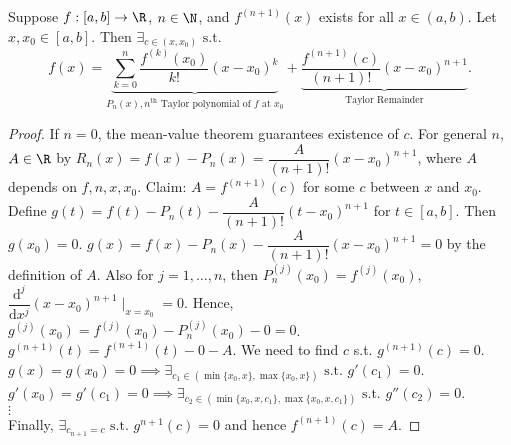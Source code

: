 \begin{thm}
	Suppose $f:[a,b]\to \R$, $n \in \N$, and $f^{(n+1)}(x)$ exists for all $x \in (a,b)$.
	Let $x, x_0 \in [a,b]$. Then $\exists_{c \in (x, x_0)} \text{ s.t. }$
	\[f(x)=\underbrace{\sum_{k=0}^{n}{\dfrac{f^{(k)}(x_0)}{k!}(x-x_0)^{k}}}_{P_n(x),\text{$n^{\text{th}}$ Taylor polynomial of $f$ at $x_0$}}+\underbrace{\dfrac{f^{(n+1)}(c)}{(n+1)!}(x-x_0)^{n+1}}_{\text{Taylor Remainder}}.\]
	\begin{proof}
		If $n=0$, the mean-value theorem guarantees existence of $c$.
		For general $n$, $A \in \R$ by $R_n(x)=f(x)-P_n(x)=\dfrac{A}{(n+1)!}(x-x_0)^{n+1}$, where $A$ depends on $f,n,x,x_0$.
		Claim: $A=f^{(n+1)}(c)$ for some $c$ between $x$ and $x_0$.\\
		Define $g(t)=f(t)-P_{n}(t)-\dfrac{A}{(n+1)!}(t-x_0)^{n+1}$ for $t \in [a,b]$. Then $g(x_0)=0$.
		$g(x)=f(x)-P_{n}(x)-\dfrac{A}{(n+1)!}(x-x_0)^{n+1}=0$ by the definition of $A$.
		Also for $j=1,\ldots ,n$, then $P_{n}^{(j)}(x_0)=f^{(j)}(x_0)$, $\dfrac{\mathrm{d}^{j}}{\mathrm{d}x^{j}}(x-x_0)^{n+1} \mid_{x=x_0}=0$.
		Hence, $g^{(j)}(x_0)=f^{(j)}(x_0)-P_{n}^{(j)}(x_0)-0=0$.
		$g^{(n+1)}(t)=f^{(n+1)}(t)-0-A$.
		We need to find $c$ s.t. $g^{(n+1)}(c)=0$.
		$g(x)=g(x_0)=0 \implies \exists_{c_1 \in (\min\{x_0,x\},\max\{x_0,x\})} \text{ s.t. } g'(c_1)=0$.\\
		$g'(x_0)=g'(c_1)=0 \implies \exists_{c_2 \in (\min\{x_0,x,c_1\},\max\{x_0,x,c_1\})} \text{ s.t. } g''(c_2)=0$.\\
		$\vdots$\\
		Finally, $\exists_{c_{n+1}=c} \text{ s.t. } g^{n+1}(c)=0$ and hence $f^{(n+1)}(c)=A$.
	\end{proof}
\end{thm}
